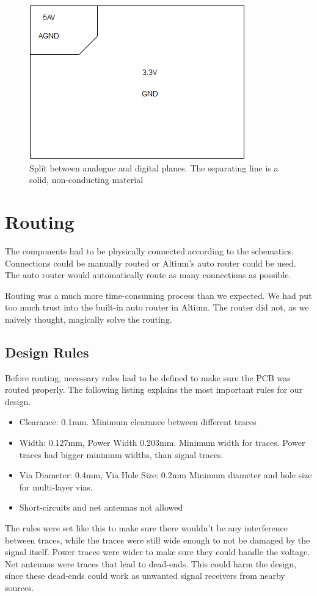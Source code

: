 \begin{figure}[h!]
\centering
\includegraphics[scale = 0.6]{images/Split_planes.png}
\caption{Split between analogue and digital planes. The separating line is a solid, non-conducting material}
\label{fig:Split planes}
\end{figure}

\section{Routing}
The components had to be physically connected according to the schematics.
Connections could be manually routed or Altium's auto router could be used. The auto router would automatically route as many connections as possible.  

Routing was a much more time-consuming process than we expected. We had put too much trust into the built-in auto router in Altium. The router did not, as we naively thought, magically solve the routing. 
\subsection{Design Rules}
Before routing, necessary rules had to be defined to make sure the PCB was routed properly. The following listing explains the most important rules for our design.
\begin{itemize}
\item Clearance: 0.1mm. 
\newline
Minimum clearance between different traces
\item Width: 0.127mm, Power Width 0.203mm.
\newline
Minimum width for traces. Power traces had bigger minimum widths, than signal traces.
\item Via Diameter: 0.4mm, Via Hole Size: 0.2mm
\newline
Minimum diameter and hole size for multi-layer vias.
\item Short-circuits and net antennas not allowed
\end{itemize}
The rules were set like this to make sure there wouldn't be any interference between traces, while the traces were still wide enough to not be damaged by the signal itself. Power traces were wider to make sure they could handle the voltage. 
\newline
Net antennas were traces that lead to dead-ends. This could harm the design, since these dead-ends could work as unwanted signal receivers from nearby sources.
\newline
